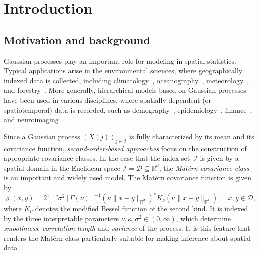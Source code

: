 \documentclass[reqno]{amsart}
\numberwithin{equation}{section}
\newcommand{\bbR}{\mathbb{R}}
\newcommand{\R}{\mathbb{R}}
\newcommand{\cD}{\mathcal{D}}
\newcommand{\cI}{\mathcal{I}}
\newcommand{\norm}[2]{     \| #1       \|_{ #2 }}
\theoremstyle{remark}
\theoremstyle{definition}
\begin{document}
\maketitle

\section{Introduction}\label{section:intro}

\subsection{Motivation and background} 

Gaussian processes play an important role 
for modeling in spatial statistics. 
Typical applications arise in the environmental sciences, 
where 
geographically indexed data is collected, 
including 
climatology~\cite{Alexeeff2018, Sang2011}, 
oceanography~\cite{Bertino2003}, 
meteorology~\cite{Handcock1994}, 
and 
forestry~\cite{Beguin2017, Jost2005, Matern1960spatial}. 
More generally, hierarchical models 
based on Gaussian processes 
have been used 
in various disciplines, 
where spatially dependent (or spatiotemporal) 
data is recorded,  
such as 
demography~\cite{DeIaco2015, Pereira2021},  
epidemiology~\cite{Lawson2014},  
finance~\cite{Fernandez2016},   
and 
neuroimaging~\cite{Mejia2020}.  

Since a Gaussian process $(X(j))_{j\in\cI}$ 
is fully characterized by its 
mean and its covariance function,  
\emph{second-order-based approaches}  
focus on the construction of 
appropriate covariance classes. 
%
In the case that the index set~$\cI$ is given by a 
spatial domain in the Euclidean space 
$\cI= \cD \subseteq \bbR^d$\!, 
the \emph{Mat\'ern covariance class} \cite{Matern1960spatial}
is an important and widely used model.  
The Mat\'ern covariance function is given by 
% 
\begin{equation}\label{eq:Matern-Cov} 
\varrho(x,y)
=
2^{1-\nu}\sigma^2[\Gamma(\nu)]^{-1} 
(\kappa \norm{x-y}{\R^d})^\nu 
K_\nu(\kappa \norm{x-y}{\R^d}), 
\quad 
x,y\in \mathcal D, 
\end{equation}
% 
where 
$K_\nu$ denotes 
the modified Bessel function of the second kind. 
% 
It is indexed by  
the three interpretable parameters 
$\nu,\kappa,\sigma^2\in(0,\infty)$, 
which determine \emph{smoothness},
\emph{correlation length} and \emph{variance} 
of the process. 
It is this feature that 
renders the Mat\'ern class 
particularly suitable for making 
inference about spatial data~\cite{Stein1999interpolation}. 
% 
\end{document}
